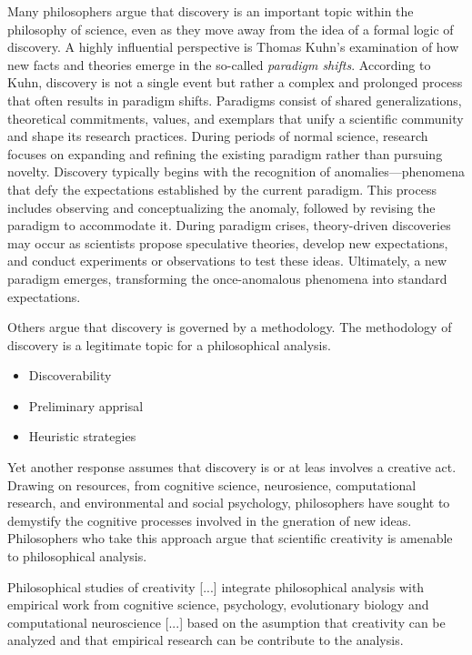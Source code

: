 Many philosophers argue that discovery is an important topic within the philosophy of science, even as they move away from the idea of a formal logic of discovery. A highly influential perspective is Thomas Kuhn's examination of how new facts and theories emerge in the so-called \emph{paradigm shifts}. According to Kuhn, discovery is not a single event but rather a complex and prolonged process that often results in paradigm shifts. Paradigms consist of shared generalizations, theoretical commitments, values, and exemplars that unify a scientific community and shape its research practices. During periods of normal science, research focuses on expanding and refining the existing paradigm rather than pursuing novelty. Discovery typically begins with the recognition of anomalies—phenomena that defy the expectations established by the current paradigm. This process includes observing and conceptualizing the anomaly, followed by revising the paradigm to accommodate it. During paradigm crises, theory-driven discoveries may occur as scientists propose speculative theories, develop new expectations, and conduct experiments or observations to test these ideas. Ultimately, a new paradigm emerges, transforming the once-anomalous phenomena into standard expectations.

{\color{red} Others argue that discovery is governed by a methodology. The methodology of discovery is a legitimate topic for a philosophical analysis.}

\begin{itemize}

\item Discoverability

\item Preliminary apprisal

\item Heuristic strategies

\end{itemize}

{\color{red} Yet another response assumes that discovery is or at leas involves a creative act. Drawing on resources, from cognitive science, neurosience, computational research, and environmental and social psychology, philosophers have sought to demystify the cognitive processes involved in the gneration of new ideas. Philosophers who take this approach argue that scientific creativity is amenable to philosophical analysis.}

{\color{red} Philosophical studies of creativity [...] integrate philosophical analysis with empirical work from cognitive science, psychology, evolutionary biology and computational neuroscience [...] based on the asumption that creativity can be analyzed and that empirical research can be contribute to the analysis.}

